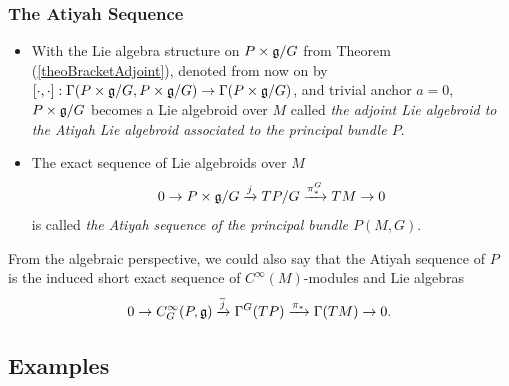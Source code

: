 \subsubsection{The Atiyah Sequence}
\begin{definition}\label{definitionAtiyahSequencePrincipalBundleVectorBundle}
    \begin{itemize}
    
    \item With the Lie algebra structure on $P \times \mathfrak{g}/G$ from Theorem (\ref{theoBracketAdjoint}), denoted from now on by $[\cdot, \cdot]: \Gamma(P \times \mathfrak{g}/G, P \times \mathfrak{g}/G) \to \Gamma(P \times \mathfrak{g}/G)$, and trivial anchor $a=0$, $P \times \mathfrak{g}/G$ becomes a Lie algebroid over $M$ called \emph{the adjoint Lie algebroid to the Atiyah Lie algebroid associated to the principal bundle $P$}.
    
    \item The exact sequence of Lie algebroids over $M$
\begin{align} \label{definitionAtiyahSequencePrincipalBundleVectorBundleuence}
    0 \to P \times \mathfrak{g}/G \xrightarrow{j} TP/G \xrightarrow{\pi_*^G} TM \to 0
\end{align}
is called \emph{the Atiyah sequence of the principal bundle $P(M, G)$}.
    \end{itemize}

From the algebraic perspective, we could also say that the Atiyah sequence of $P$ is the induced short exact sequence of $C^\infty(M)$-modules and Lie algebras
\begin{align} \label{equationdefinitionAtiyahSequencePrincipalBundleVectorBundleuencePrincipalBundleSectionsSequence}
    0 \to C^\infty_G(P, \mathfrak{g}) \xrightarrow{\overline{j}} \Gamma^G(TP) \xrightarrow{\pi_*} \Gamma(TM) \to 0.
\end{align}

\end{definition}

\subsection{Examples}

